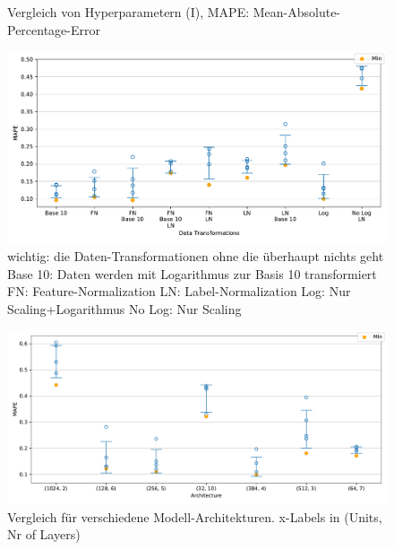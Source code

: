 \begin{figure}[tbp]
	\caption{Vergleich von Hyperparametern (I), MAPE: Mean-Absolute-Percentage-Error}
	\label{12,13,16,36}
\end{figure}

\begin{figure}[tbp]
	\centering
	\includegraphics[width=14cm]{graphics/17,18}
	\caption{wichtig: die Daten-Transformationen ohne die überhaupt nichts geht \newline
			Base 10: Daten werden mit Logarithmus zur Basis 10 transformiert \newline
			FN: Feature-Normalization \newline
			LN: Label-Normalization \newline
			Log: Nur Scaling+Logarithmus \newline 
			No Log: Nur Scaling}
\end{figure}
\begin{figure}[tbp]
	\centering
	\includegraphics[width=14cm]{graphics/33}
	\caption{Vergleich für verschiedene Modell-Architekturen. \newline
		x-Labels in (Units, Nr of Layers)}
\end{figure}

